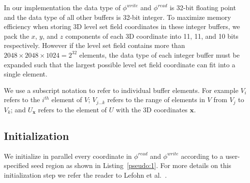 \documentclass{egpubl}
\newcommand{\leftbracket}{\left(}
\newcommand{\rightbracket}{\right)}
\newcommand{\boldx}{{\mathbf x}}
\newcommand{\phiread}{ \phi^{read} }
\newcommand{\phiwrite}{ \phi^{write} }
\begin{document}
In our implementation the data type of $\phiwrite$ and $\phiread$ is 32-bit floating point and the data type of all other buffers is 32-bit integer. To maximize memory efficiency when storing 3D level set field coordinates in these integer buffers, we pack the $x$, $y$, and $z$ components of each 3D coordinate into 11, 11, and 10 bits respectively. However if the level set field contains more than $2048 \times 2048 \times 1024 = 2^{32}$ elements, the data type of each integer buffer must be expanded such that the largest possible level set field coordinate can fit into a single element.

We use a subscript notation to refer to individual buffer elements. For example $V_i$ refers to the $i^{th}$ element of $V$; $V_{j \ldots k }$ refers to the range of elements in $V$ from $V_j$ to $V_k$; and $U_{\boldx}$ refers to the element of $U$ with the 3D coordinates $\boldx$.



\subsection{Initialization}
\label{subsec:initialization}

We initialize in parallel every coordinate in $\phiread$ and $\phiwrite$ according to a user-specified seed region as shown in Listing~\ref{pseudo:1}. For more details on this initialization step we refer the reader to Lefohn et al.~\cite{Lefohn-2004}.
\end{document}
